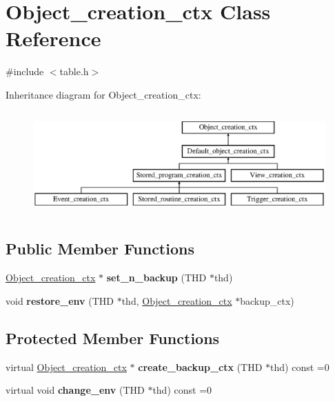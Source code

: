 \hypertarget{classObject__creation__ctx}{}\section{Object\+\_\+creation\+\_\+ctx Class Reference}
\label{classObject__creation__ctx}


{\ttfamily \#include $<$table.\+h$>$}

Inheritance diagram for Object\+\_\+creation\+\_\+ctx\+:\begin{figure}[H]
\begin{center}
\leavevmode
\includegraphics[height=3.992870cm]{classObject__creation__ctx}
\end{center}
\end{figure}
\subsection*{Public Member Functions}
\begin{DoxyCompactItemize}
\item 
\mbox{\label{classObject__creation__ctx_afa626d99a0d6bc2f6ef8c61b1c2bc6f9}} 
\mbox{\hyperlink{classObject__creation__ctx}{Object\+\_\+creation\+\_\+ctx}} $\ast$ {\bfseries set\+\_\+n\+\_\+backup} (T\+HD $\ast$thd)
\item 
\mbox{\label{classObject__creation__ctx_a13d0960b25a1798435df6c9d32bccbc3}} 
void {\bfseries restore\+\_\+env} (T\+HD $\ast$thd, \mbox{\hyperlink{classObject__creation__ctx}{Object\+\_\+creation\+\_\+ctx}} $\ast$backup\+\_\+ctx)
\end{DoxyCompactItemize}
\subsection*{Protected Member Functions}
\begin{DoxyCompactItemize}
\item 
\mbox{\label{classObject__creation__ctx_a3b65a79491550ad1bc51dc9b89beec3a}} 
virtual \mbox{\hyperlink{classObject__creation__ctx}{Object\+\_\+creation\+\_\+ctx}} $\ast$ {\bfseries create\+\_\+backup\+\_\+ctx} (T\+HD $\ast$thd) const =0
\item 
\mbox{\label{classObject__creation__ctx_a8268ee57f5648955df4046cf611fa87b}} 
virtual void {\bfseries change\+\_\+env} (T\+HD $\ast$thd) const =0
\end{DoxyCompactItemize}


